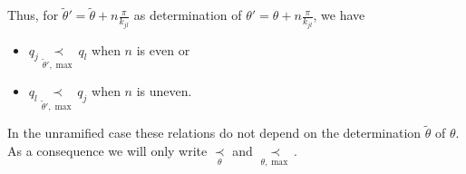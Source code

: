\begin{defn}
\begin{itemize}
\begin{s-rem}
        Thus, for $\tilde\theta'=\tilde\theta+n\frac{\pi}{k_{jl}}$ as
        determination of $\theta'=\theta+n\frac{\pi}{k_{jl}}$, we have
        \begin{itemize}
          \item $q_j \underset{\tilde\theta',\max}{\prec} q_l$ when $n$ is even
            or
          \item $q_l \underset{\tilde\theta',\max}{\prec} q_j$ when $n$ is
            uneven.
        \end{itemize}
      \end{s-rem}
  \end{itemize}
  \begin{s-rem}
    In the unramified case these relations do not depend on the determination
    $\tilde\theta$ of $\theta$. As a consequence we will only write
    $\underset{\theta}{\prec}$ and $\underset{\theta,\max}{\prec}$.
  \end{s-rem}
\end{defn}

